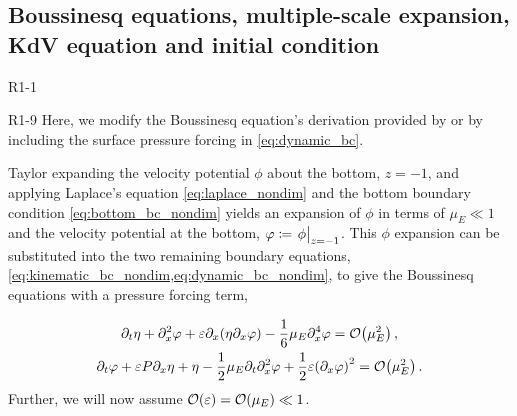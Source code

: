 \documentclass{jfm}
\renewcommand*{\epsilon}{\varepsilon}
\begin{document}
\subsection{\label{sec:boussinesq} Boussinesq equations, multiple-scale
expansion, KdV equation and initial condition}
\begin{LineLabel}{R1-1}
\begin{LineLabel}{R1-9}
Here, we modify the Boussinesq equation's derivation provided by
\citet{mei2005nonlinear} or \citet{ablowitz2011nonlinear} by including
the surface pressure forcing in \cref{eq:dynamic_bc}.
\end{LineLabel}
Taylor expanding the velocity potential $\phi$ about the bottom,
$z=-1$, and applying Laplace's
equation \cref{eq:laplace_nondim} and the bottom boundary
condition \cref{eq:bottom_bc_nondim} yields an expansion of $\phi$ in
terms of $\mu_E \ll 1$ and the velocity potential at the bottom,
$\varphi \coloneqq \eval{\phi}_{z=-1}$.
This $\phi$ expansion can be substituted into the two remaining boundary
equations, \cref{eq:kinematic_bc_nondim,eq:dynamic_bc_nondim}, to give
the Boussinesq equations with a pressure forcing term,
\end{LineLabel}
\begin{gather}
  \partial_t \eta + \partial_x^2 \varphi + \epsilon \partial_x
    \pqty{\eta \partial_x \varphi} -\frac{1}{6}\mu_E \partial^4_x
    \varphi = \order{\mu_E^2} \label{eq:kinematic_bc_varphi} \,, \\
  \partial_t \varphi + \epsilon P \partial_x \eta + \eta -
    \frac{1}{2}\mu_E \partial_t \partial_x^2 \varphi +
    \frac{1}{2}\epsilon\pqty{\partial_x \varphi}^2 = \order{\mu_E^2} \,.
    \label{eq:dynamic_bc_varphi}
\end{gather}
Further, we will now assume $\order{\epsilon} = \order{\mu_E} \ll 1$.
\end{document}
